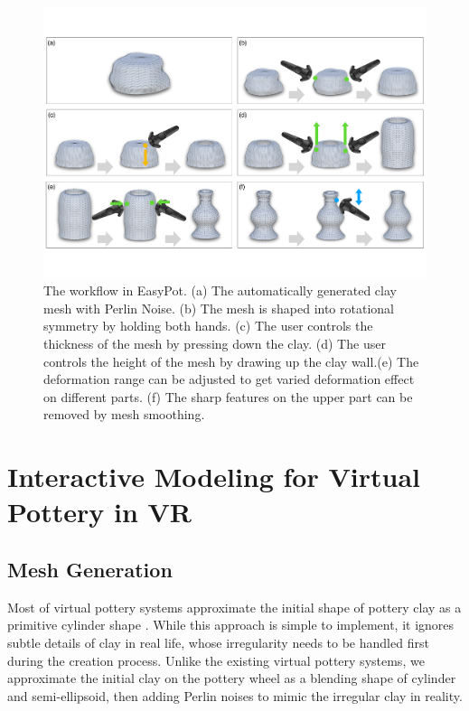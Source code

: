 \documentclass{svjour3}                     %
\begin{document}
\begin{figure}
\includegraphics[width=\textwidth]{workflow.pdf}
\caption{The workflow in EasyPot. (a) The automatically generated clay mesh with Perlin Noise. (b) The mesh is shaped into rotational symmetry by holding both hands. (c) The user controls the thickness of the mesh by pressing down the clay. (d) The user controls the height of the mesh by drawing up the clay wall.(e) The deformation range can be adjusted to get varied deformation effect on different parts. (f) The sharp features on the upper part can be removed by mesh smoothing.}
\label{fig:workflow}
\end{figure}

\section{Interactive Modeling for Virtual Pottery in VR}
\label{sec:4}

\subsection{Mesh Generation}
\label{sec:4.1}

Most of virtual pottery systems approximate the initial shape of pottery clay as a primitive cylinder shape \cite{han2007ar,ramani2015gesture,ramani2016extracting}. While this approach is simple to implement, it ignores subtle details of clay in real life, whose irregularity needs to be handled first during the creation process. Unlike the existing virtual pottery systems, we approximate the initial clay on the pottery wheel as a blending shape of cylinder and semi-ellipsoid, then adding Perlin noises to mimic the irregular clay in reality.
\end{document}
